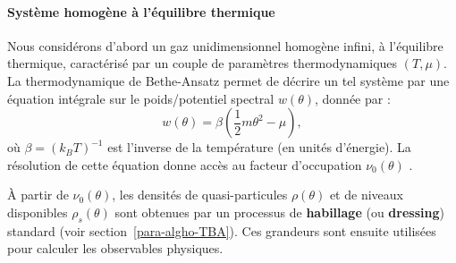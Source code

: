 

\paragraph{Système homogène à l'équilibre thermique}

Nous considérons d’abord un gaz unidimensionnel homogène infini, à l’équilibre thermique, caractérisé par un couple de paramètres thermodynamiques $(T, \mu)$. La thermodynamique de Bethe-Ansatz permet de décrire un tel système par une équation intégrale sur le poids/potentiel spectral $w(\theta)$, donnée par :
\begin{equation}
w(\theta) = \beta\left(\frac{1}{2}m\theta^2 - \mu\right),
\end{equation}
où $\beta = (k_B T)^{-1}$ est l’inverse de la température (en unités d’énergie). La résolution de cette équation donne accès au facteur d’occupation $\nu_0(\theta)$ .

À partir de $\nu_0(\theta)$, les densités de quasi-particules $\rho(\theta)$ et de niveaux disponibles $\rho_s(\theta)$ sont obtenues par un processus de {\bf habillage} (ou {\bf dressing}) standard (voir section~\ref{para-algho-TBA}). Ces grandeurs sont ensuite utilisées pour calculer les observables physiques.



%
%
%

